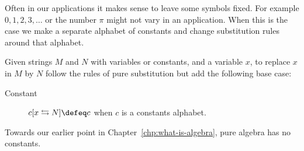 Often in our applications it makes sense to leave some symbols fixed.
For example $0,1,2,3,\ldots$ or the number $\pi$ might not vary in an application.
When this is the case we make a separate alphabet of constants and change substitution 
rules around that alphabet.
\begin{definition}
    Given strings $M$ and $N$ with variables or constants, 
    and a variable $x$, to replace $x$ in $M$ by $N$ 
    follow the rules of pure substitution but add the following  base case:
    \begin{description}
        \item[Constant] $c[x\leftrightarrows N]\defeq c$ when $c$ is a constants alphabet. 
    \end{description}
\end{definition}

Towards our earlier point in Chapter~\ref{chp:what-is-algebra}, pure algebra has no constants.


